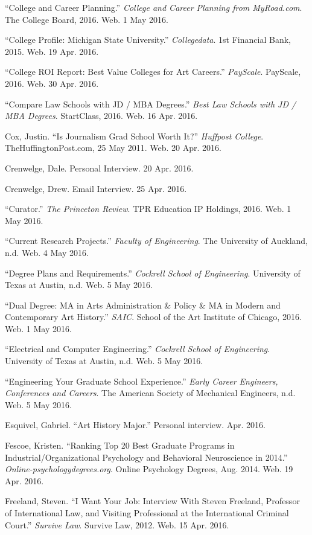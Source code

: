 \begin{workscited}
\begin{flushleft}
\bibent
“College and Career Planning.” \textit{College and Career Planning from MyRoad.com}. The College Board, 2016. Web. 1 May 2016.

\bibent
“College Profile: Michigan State University.” \textit{Collegedata}. 1st Financial Bank, 2015. Web. 19 Apr. 2016. 

\bibent
“College ROI Report: Best Value Colleges for Art Careers.” \textit{PayScale}. PayScale, 2016. Web. 30 Apr. 2016.

\bibent
“Compare Law Schools with JD / MBA Degrees.” \textit{Best Law Schools with JD / MBA Degrees}. StartClass, 2016. Web. 16 Apr. 2016.

\bibent
Cox, Justin. “Is Journalism Grad School Worth It?” \textit{Huffpost College}. TheHuffingtonPost.com, 25 May 2011. Web. 20 Apr. 2016.

\bibent
Crenwelge, Dale. Personal Interview. 20 Apr. 2016.

\bibent
Crenwelge, Drew. Email Interview. 25 Apr. 2016.

\bibent
“Curator.” \textit{The Princeton Review}. TPR Education IP Holdings, 2016. Web. 1 May 2016.

\bibent
“Current Research Projects.” \textit{Faculty of Engineering}. The University of Auckland, n.d. Web. 4 May 2016.

\bibent
“Degree Plans and Requirements.” \textit{Cockrell School of Engineering}. University of Texas at Austin, n.d. Web. 5 May 2016.

\bibent
“Dual Degree: MA in Arts Administration \& Policy \& MA in Modern and Contemporary Art History.” \textit{SAIC}. School of the Art Institute of Chicago, 2016. Web. 1 May 2016.

\bibent
“Electrical and Computer Engineering.” \textit{Cockrell School of Engineering}. University of Texas at Austin, n.d. Web. 5 May 2016.

\bibent
“Engineering Your Graduate School Experience.” \textit{Early Career Engineers, Conferences and Careers}. The American Society of Mechanical Engineers, n.d. Web. 5 May 2016.

\bibent
Esquivel, Gabriel. “Art History Major.” Personal interview. Apr. 2016.

\bibent
Fescoe, Kristen. “Ranking Top 20 Best Graduate Programs in Industrial/Organizational Psychology and Behavioral Neuroscience in 2014.” \textit{Online-psychologydegrees.org}. Online Psychology Degrees, Aug. 2014. Web. 19 Apr. 2016.

\bibent
Freeland, Steven. “I Want Your Job: Interview With Steven Freeland, Professor of International Law, and Visiting Professional at the International Criminal Court.” \textit{Survive Law}. Survive Law, 2012. Web. 15 Apr. 2016. 


\end{flushleft}
\end{workscited}
